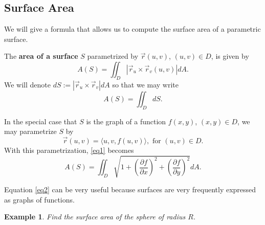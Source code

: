 \documentclass[12pt]{article}
\newcommand{\p}{\partial}
\newcommand{\vr}{\vec{r}{}}
\renewcommand{\lg}{\langle}
\newcommand{\rg}{\rangle}
\newcommand{\rcross}{\vr_u\times\vr_v}
\newtheorem{example}{Example}
\begin{document}
\subsection*{Surface Area}
We will give a formula that allows us to compute the surface area of a parametric surface.

The \textbf{area of a surface} $S$ parametrized by $\vr(u,v)$, $(u,v)\in D$, is given by \begin{equation}\label{eq1}A(S)=\iint_D|\rcross(u,v)|dA.
\end{equation} We will denote $dS:=|\rcross|dA$ so that we may write $$A(S)=\iint_D dS.$$

In the special case that $S$ is the graph of a function $f(x,y)$, $(x,y)\in D$, we may parametrize $S$ by $$\vr(u,v)=\lg u,v,f(u,v)\rg,\text{ for }(u,v)\in D.$$ With this parametrization, \eqref{eq1} becomes \begin{equation}\label{eq2}A(S)=\iint_D\sqrt{1+\left (\frac{\p f}{\p x}\right )^2+\left( \frac{\p f}{\p y}\right )^2}dA.\end{equation}

Equation \eqref{eq2} can be very useful because surfaces are very frequently expressed as graphs of functions.

\begin{example}
Find the surface area of the sphere of radius $R$.
\end{example}
\end{document}
